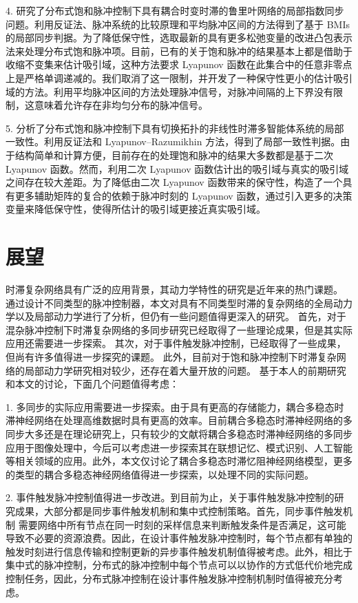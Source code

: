 4. 研究了分布式饱和脉冲控制下具有耦合时变时滞的鲁里叶网络的局部指数同步问题。利用反证法、脉冲系统的比较原理和平均脉冲区间的方法得到了基于 BMIs 的局部同步判据。为了降低保守性，选取最新的具有更多松弛变量的改进凸包表示法来处理分布式饱和脉冲项。目前，已有的关于饱和脉冲的结果基本上都是借助于收缩不变集来估计吸引域，这种方法要求 Lyapunov 函数在此集合中的任意非零点上是严格单调递减的。我们取消了这一限制，并开发了一种保守性更小的估计吸引域的方法。利用平均脉冲区间的方法处理脉冲信号，对脉冲间隔的上下界没有限制，这意味着允许存在非均匀分布的脉冲信号。

5. 分析了分布式饱和脉冲控制下具有切换拓扑的非线性时滞多智能体系统的局部一致性。利用反证法和 Lyapunov–Razumikhin 方法，得到了局部一致性判据。由于结构简单和计算方便，目前存在的处理饱和脉冲的结果大多数都是基于二次  Lyapunov 函数。然而，利用二次 Lyapunov 函数估计出的吸引域与真实的吸引域之间存在较大差距。为了降低由二次 Lyapunov 函数带来的保守性，构造了一个具有更多辅助矩阵的复合的依赖于脉冲时刻的 Lyapunov 函数，通过引入更多的决策变量来降低保守性，使得所估计的吸引域更接近真实吸引域。

\section{展望} 
时滞复杂网络具有广泛的应用背景，其动力学特性的研究是近年来的热门课题。 通过设计不同类型的脉冲控制器，本文对具有不同类型时滞的复杂网络的全局动力学以及局部动力学进行了分析，但仍有一些问题值得更深入的研究。
首先，对于混杂脉冲控制下时滞复杂网络的多同步研究已经取得了一些理论成果，但是其实际应用还需要进一步探索。
其次，对于事件触发脉冲控制，已经取得了一些成果，但尚有许多值得进一步探究的课题。
此外，目前对于饱和脉冲控制下时滞复杂网络的局部动力学研究相对较少，还存在着大量开放的问题。
基于本人的前期研究和本文的讨论，下面几个问题值得考虑：






1. 多同步的实际应用需要进一步探索。由于具有更高的存储能力，耦合多稳态时滞神经网络在处理高维数据时具有更高的效率。目前耦合多稳态时滞神经网络的多同步大多还是在理论研究上，只有较少的文献将耦合多稳态时滞神经网络的多同步应用于图像处理中，今后可以考虑进一步探索其在联想记忆、模式识别、人工智能等相关领域的应用。此外，本文仅讨论了耦合多稳态时滞忆阻神经网络模型，更多的类型的耦合多稳态神经网络值得进一步探索，以处理不同的实际问题。


2. 事件触发脉冲控制值得进一步改进。到目前为止，关于事件触发脉冲控制的研究成果，大部分都是同步事件触发机制和集中式控制策略。首先，同步事件触发机制
需要网络中所有节点在同一时刻的采样信息来判断触发条件是否满足，这可能导致不必要的资源浪费。因此，在设计事件触发脉冲控制时，每个节点都有单独的触发时刻进行信息传输和控制更新的异步事件触发机制值得被考虑。此外，相比于集中式的脉冲控制，分布式的脉冲控制中每个节点可以以协作的方式低代价地完成控制任务，因此，分布式脉冲控制在设计事件触发脉冲控制机制时值得被充分考虑。 


